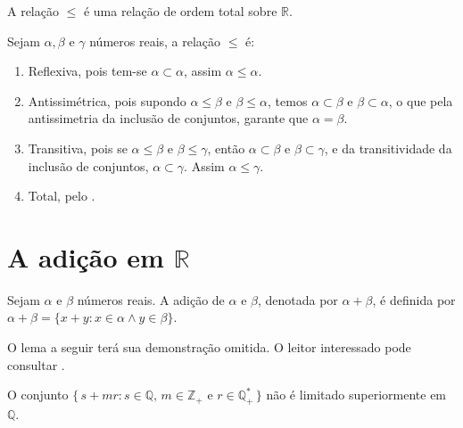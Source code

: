 \documentclass[../main.tex]{subfiles}
\begin{document}
\begin{teo}\label{reais-teo-ordemTotal}
    A relação $\leq$ é uma relação de ordem total sobre $\mathbb{R}$.
\end{teo}
\begin{dem}
    Sejam $\alpha, \beta$ e $\gamma$ números reais, a relação $\leq$ é:
    \begin{enumerate}[label=(\roman*)]
        \item Reflexiva, pois tem-se $\alpha \subset \alpha$, assim $\alpha \leq \alpha$.
        \item Antissimétrica, pois supondo $\alpha \leq \beta$ e $\beta \leq \alpha$, temos $\alpha \subset \beta$ e $\beta \subset \alpha$, o que pela antissimetria da inclusão de conjuntos, garante que $\alpha = \beta$.
        \item Transitiva, pois se $\alpha \leq \beta$ e $\beta \leq \gamma$, então $\alpha \subset \beta$ e $\beta \subset \gamma$, e da transitividade da inclusão de conjuntos, $\alpha \subset \gamma$. Assim $\alpha \leq \gamma$.
        \item Total, pelo .
    \end{enumerate}
\end{dem}

\section{A adição em $\mathbb{R}$}
\begin{defi}\label{reais-def-adicao}
    Sejam $\alpha$ e $\beta$ números reais. A adição de $\alpha$ e $\beta$, denotada por $\alpha + \beta$, é definida por $\alpha + \beta = \{ x + y : x \in \alpha \land y \in \beta \}$.
\end{defi}

O lema a seguir terá sua demonstração omitida. O leitor interessado pode consultar \textcite[p. 73]{ferreira}.
\begin{lema}
    O conjunto $\{\,s + mr : s \in \mathbb{Q} \text{, } m \in \mathbb{Z}_{+} \text{ e } r \in \mathbb{Q}_{+}^* \,\}$ não é limitado superiormente em $\mathbb{Q}$.
\end{lema}
\end{document}
